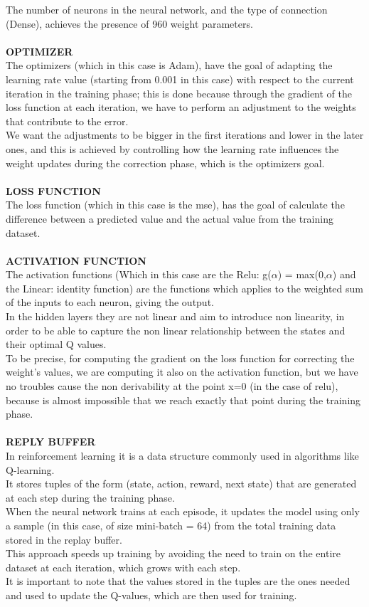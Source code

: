 \documentclass{article}
\begin{document}
The number of neurons in the neural network, and the type of connection (Dense), achieves the presence of 960 weight parameters.
\\
\\
\textbf{OPTIMIZER}
\\
The optimizers (which in this case is Adam), have the goal of adapting the learning rate value (starting from 0.001 in this case) with respect to the current iteration in the training phase; this is done because through the gradient of the loss function at each iteration, we have to perform an adjustment to the weights that contribute to the error.
\\
We want the adjustments to be bigger in the first iterations and lower in the later ones, and this is achieved by controlling how the learning rate influences the weight updates during the correction phase, which is the optimizers goal.
\\
\\
\textbf{LOSS FUNCTION}
\\
The loss function (which in this case is the mse), has the goal of calculate the difference between a predicted value and the actual value from the training dataset.
\\
\\
\textbf{ACTIVATION FUNCTION}
\\
The activation functions (Which in this case are the Relu: g($\alpha$) = max(0,$\alpha$) and the Linear: identity function) are the functions which applies to the weighted sum of the inputs to each neuron, giving the output.
\\
In the hidden layers they are not linear and aim to introduce non linearity, in order to be able to capture the non linear relationship between the states and their optimal Q values.
\\
To be precise, for computing the gradient on the loss function for correcting the weight's values, we are computing it also on the activation function, but we have no troubles cause the non derivability at the point x=0 (in the case of relu), because is almost impossible that we reach exactly that point during the training phase.
\\
\\
\textbf{REPLY BUFFER}
\\
In reinforcement learning it is a data structure commonly used in algorithms like Q-learning.
\\
It stores tuples of the form (state, action, reward, next state) that are generated at each step during the training phase.
\\
When the neural network trains at each episode, it updates the model using only a sample (in this case, of size mini-batch = 64) from the total training data stored in the replay buffer. 
\\
This approach speeds up training by avoiding the need to train on the entire dataset at each iteration, which grows with each step.
\\
It is important to note that the values stored in the tuples are the ones needed and used to update the Q-values, which are then used for training.
\end{document}

